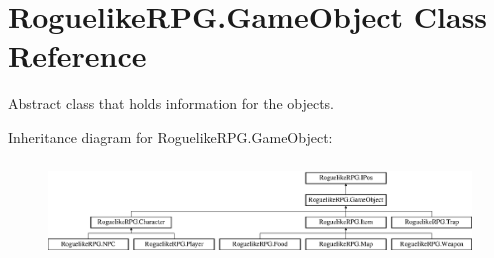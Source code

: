 \hypertarget{class_roguelike_r_p_g_1_1_game_object}{}\section{Roguelike\+R\+P\+G.\+Game\+Object Class Reference}
\label{class_roguelike_r_p_g_1_1_game_object}


Abstract class that holds information for the objects.  


Inheritance diagram for Roguelike\+R\+P\+G.\+Game\+Object\+:\begin{figure}[H]
\begin{center}
\leavevmode
\includegraphics[height=2.589595cm]{class_roguelike_r_p_g_1_1_game_object}
\end{center}
\end{figure}
